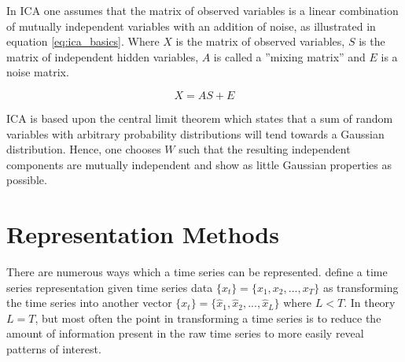 In ICA one assumes that the matrix of observed variables is a linear combination of mutually independent variables with an addition of noise, as illustrated in equation \ref{eq:ica_basics}. 
Where $X$ is the matrix of observed variables, $S$ is the matrix of independent hidden variables, $A$ is called a ''mixing matrix'' and $E$ is a noise matrix.  

\begin{equation}
    X = A S + E
    \label{eq:ica_basics}
\end{equation}

ICA is based upon the central limit theorem which states that a sum of random variables with arbitrary probability distributions will tend towards a Gaussian distribution. 
Hence, one chooses $W$ such that the resulting independent components are mutually independent and show as little Gaussian properties as possible.

\section{Representation Methods}
There are numerous ways which a time series can be represented. 
\textcite{tsc_rev} define a time series representation given time series data $\{x_t\} = \{x_1, x_2, ... ,x_T\}$ as transforming the time series into another vector $\{x_t\} = \{\hat{x}_1, \hat{x}_2, ... ,\hat{x}_L\}$ where $L < T$. 
In theory $L=T$, but most often the point in transforming a time series is to reduce the amount of information present in the raw time series to more easily reveal patterns of interest. \bigskip
% 

